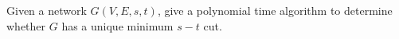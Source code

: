 \problem{}
Given a network $G(V, E, s, t)$, give a polynomial time algorithm to determine whether $G$ has a unique minimum $s-t$ cut.

\solution{
}
\newpage